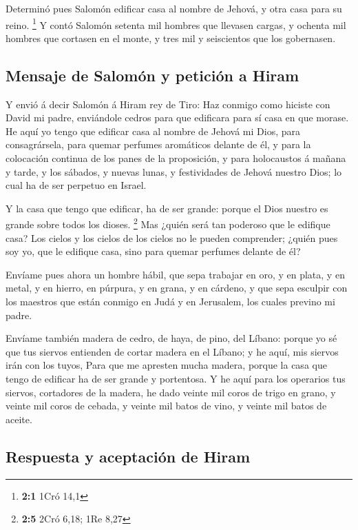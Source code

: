  Determinó pues Salomón edificar casa al nombre de Jehová, y
otra casa para su reino. \footnote{\textbf{2:1} 1Cró 14,1} 
Y contó Salomón setenta mil hombres que llevasen cargas, y ochenta mil
hombres que cortasen en el monte, y tres mil y seiscientos que los
gobernasen.

\hypertarget{mensaje-de-salomuxf3n-y-peticiuxf3n-a-hiram}{%
\subsection{Mensaje de Salomón y petición a
Hiram}\label{mensaje-de-salomuxf3n-y-peticiuxf3n-a-hiram}}

 Y envió á decir Salomón á Hiram rey de Tiro: Haz conmigo
como hiciste con David mi padre, enviándole cedros para que edificara
para sí casa en que morase.  He aquí yo tengo que edificar
casa al nombre de Jehová mi Dios, para consagrársela, para quemar
perfumes aromáticos delante de él, y para la colocación continua de los
panes de la proposición, y para holocaustos á mañana y tarde, y los
sábados, y nuevas lunas, y festividades de Jehová nuestro Dios; lo cual
ha de ser perpetuo en Israel.

 Y la casa que tengo que edificar, ha de ser grande: porque
el Dios nuestro es grande sobre todos los dioses. \footnote{\textbf{2:5}
  2Cró 6,18; 1Re 8,27}  Mas ¿quién será tan poderoso que le
edifique casa? Los cielos y los cielos de los cielos no le pueden
comprender; ¿quién pues soy yo, que le edifique casa, sino para quemar
perfumes delante de él?

 Envíame pues ahora un hombre hábil, que sepa trabajar en
oro, y en plata, y en metal, y en hierro, en púrpura, y en grana, y en
cárdeno, y que sepa esculpir con los maestros que están conmigo en Judá
y en Jerusalem, los cuales previno mi padre.

 Envíame también madera de cedro, de haya, de pino, del
Líbano: porque yo sé que tus siervos entienden de cortar madera en el
Líbano; y he aquí, mis siervos irán con los tuyos,  Para que
me apresten mucha madera, porque la casa que tengo de edificar ha de ser
grande y portentosa.  Y he aquí para los operarios tus
siervos, cortadores de la madera, he dado veinte mil coros de trigo en
grano, y veinte mil coros de cebada, y veinte mil batos de vino, y
veinte mil batos de aceite.

\hypertarget{respuesta-y-aceptaciuxf3n-de-hiram}{%
\subsection{Respuesta y aceptación de
Hiram}\label{respuesta-y-aceptaciuxf3n-de-hiram}}

